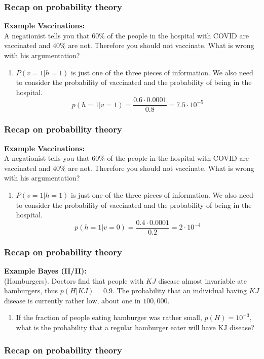 \documentclass{beamer}
\begin{document}
\begin{frame}
	\frametitle{Recap on probability theory}
    \textbf{Example Vaccinations:}\\
  	A negationist tells you that $60\%$ of the people in the hospital with COVID are vaccinated and $40\%$ are not.
	Therefore you should not vaccinate.
	What is wrong with his argumentation?
	\begin{enumerate}
	\item $P(v=1|h=1)$ is just one of the three pieces of information.
	We also need to consider the probability of vaccinated and the probability of being in the hospital.
	$$p(h=1|v=1) = \frac{0.6\cdot 0.0001}{0.8}= 7.5\cdot 10^{-5}$$

	\end{enumerate}
\end{frame}
\begin{frame}
	\frametitle{Recap on probability theory}
    \textbf{Example Vaccinations:}\\
  	A negationist tells you that $60\%$ of the people in the hospital with COVID are vaccinated and $40\%$ are not.
	Therefore you should not vaccinate.
	What is wrong with his argumentation?
	\begin{enumerate}
	\item $P(v=1|h=1)$ is just one of the three pieces of information.
	We also need to consider the probability of vaccinated and the probability of being in the hospital.
	$$p(h=1|v=0) = \frac{0.4\cdot 0.0001}{0.2}= 2\cdot 10^{-4}$$
	\end{enumerate}
\end{frame}

\iffalse
\begin{frame}
	\frametitle{Recap on probability theory}
    \textbf{Example Bayes (II/II):}\\
  	(Hamburgers). Doctors find that people with $KJ$ disease almost invariable ate hamburgers, thus $p(H|KJ)=0.9$.
	The probability that an individual having $KJ$ disease is currently rather low, about one in $100,000$.
	\begin{enumerate}
\item If the fraction of people eating hamburger was rather small, $p(H)=10^{-3}$, what is the probability that a regular hamburger eater will have KJ disease?
	\end{enumerate}
\end{frame}


\begin{frame}
	\frametitle{Recap on probability theory}
\end{frame}
\end{document}
